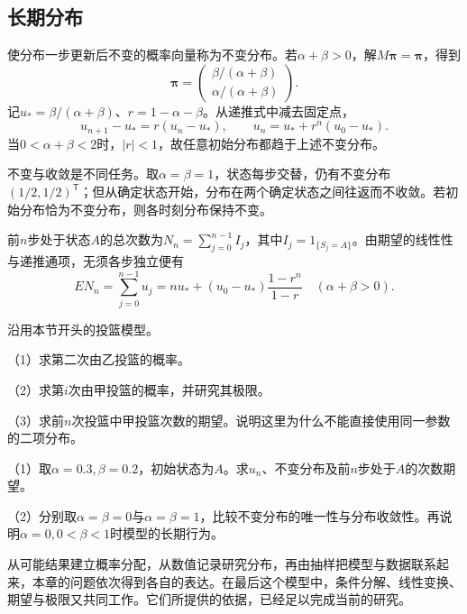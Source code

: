 \subsection{长期分布}

使分布一步更新后不变的概率向量称为{\heiti 不变分布}。若\(\alpha+\beta>0\)，解\(M\boldsymbol\pi=\boldsymbol\pi\)，得到
\begin{equation}\label{eq:prob-stationary}
 \boldsymbol\pi=\begin{pmatrix}\beta/(\alpha+\beta)\\\alpha/(\alpha+\beta)\end{pmatrix}.
\end{equation}
记\(u_*=\beta/(\alpha+\beta)\)、\(r=1-\alpha-\beta\)。从递推式中减去固定点，
\[
 u_{n+1}-u_*=r(u_n-u_*),\qquad
 u_n=u_*+r^n(u_0-u_*).
\]
当\(0<\alpha+\beta<2\)时，\(|r|<1\)，故任意初始分布都趋于上述不变分布。

不变与收敛是不同任务。取\(\alpha=\beta=1\)，状态每步交替，仍有不变分布\((1/2,1/2)^{\mathsf T}\)；但从确定状态开始，分布在两个确定状态之间往返而不收敛。若初始分布恰为不变分布，则各时刻分布保持不变。

前\(n\)步处于状态\(A\)的总次数为\(N_n=\sum_{j=0}^{n-1}I_j\)，其中\(I_j=1_{\{S_j=A\}}\)。由期望的线性性与递推通项，无须各步独立便有
\[
 EN_n=\sum_{j=0}^{n-1}u_j
 =nu_*+(u_0-u_*)\frac{1-r^n}{1-r}
 \quad(\alpha+\beta>0).
\]
\begin{example}[据2023年新课标I卷改编]
沿用本节开头的投篮模型。

（1）求第二次由乙投篮的概率。

（2）求第\(i\)次由甲投篮的概率，并研究其极限。

（3）求前\(n\)次投篮中甲投篮次数的期望。说明这里为什么不能直接使用同一参数的二项分布。
\end{example}

\begin{exercise}
\mbox{}\par\nobreak

（1）取\(\alpha=0.3,\beta=0.2\)，初始状态为\(A\)。求\(u_n\)、不变分布及前\(n\)步处于\(A\)的次数期望。

（2）分别取\(\alpha=\beta=0\)与\(\alpha=\beta=1\)，比较不变分布的唯一性与分布收敛性。再说明\(\alpha=0,0<\beta<1\)时模型的长期行为。
\end{exercise}

从可能结果建立概率分配，从数值记录研究分布，再由抽样把模型与数据联系起来，本章的问题依次得到各自的表达。在最后这个模型中，条件分解、线性变换、期望与极限又共同工作。它们所提供的依据，已经足以完成当前的研究。
